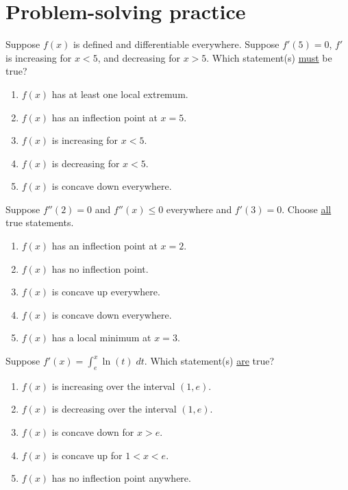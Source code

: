 \documentclass[../main.tex]{subfiles}
\begin{document}
 \section{Problem-solving practice}

\begin{exercise}
  Suppose \(f(x)\) is defined and differentiable everywhere.  Suppose \(f'(5) = 0\), \(f'\) is increasing for \(x < 5\), and decreasing for \(x > 5\).  Which statement(s) \uline{must} be true?

  \begin{enumerate}[label=\Alph*.]
    \item \(f(x)\) has at least one local extremum.
    \item \(f(x)\) has an inflection point at \(x = 5\).
    \item \(f(x)\) is increasing for \(x < 5\).
    \item \(f(x)\) is decreasing for \(x < 5\).
    \item \(f(x)\) is concave down everywhere.
  \end{enumerate}
\end{exercise}

\vfill{}


\begin{exercise}
  Suppose \(f''(2) = 0\) and \(f''(x) \le 0\) everywhere and \(f'(3) = 0\). Choose \uline{all} true statements.

  \begin{enumerate}[label=\Alph*.]
    \item \(f(x)\) has an inflection point at \(x = 2\).
    \item \(f(x)\) has no inflection point.
    \item \(f(x)\) is concave up everywhere.
    \item \(f(x)\) is concave down everywhere.
    \item \(f(x)\) has a local minimum at \(x = 3\).
  \end{enumerate}
\end{exercise}

\vfill{}

\begin{exercise}
  Suppose \(f'(x) = \int_{e}^{x} \ln(t) \;dt\).  Which statement(s) \uline{are} true?

  \begin{enumerate}[label=\Alph*.]
    \item \(f(x)\) is increasing over the interval \((1,e)\).
    \item \(f(x)\) is decreasing over the interval \((1,e)\).
    \item \(f(x)\) is concave down for \(x > e\).
    \item \(f(x)\) is concave up for \(1 < x < e\).
    \item \(f(x)\) has no inflection point anywhere.
  \end{enumerate}
\end{exercise}
\end{document}
